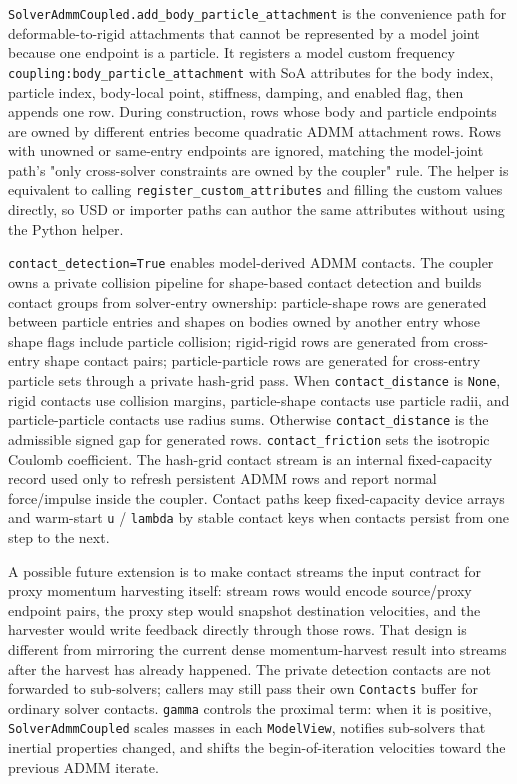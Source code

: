 \documentclass[11pt]{article}
\begin{document}
\texttt{SolverAdmmCoupled.add\_body\_particle\_attachment} is the convenience
path for deformable-to-rigid attachments that cannot be represented by a model
joint because one endpoint is a particle. It registers a model custom frequency
\texttt{coupling:body\_particle\_attachment} with SoA attributes for the body
index, particle index, body-local point, stiffness, damping, and enabled flag, then
appends one row. During construction, rows whose body and particle endpoints are
owned by different entries become quadratic ADMM attachment rows. Rows with
unowned or same-entry endpoints are ignored, matching the model-joint path's
"only cross-solver constraints are owned by the coupler" rule. The helper is
equivalent to calling \texttt{register\_custom\_attributes} and filling the
custom values directly, so USD or importer paths can author the same attributes
without using the Python helper.

\texttt{contact\_detection=True} enables model-derived ADMM contacts. The
coupler owns a private collision pipeline for shape-based contact detection and
builds contact groups from solver-entry ownership: particle-shape rows are
generated between particle entries and shapes on bodies owned by another entry
whose shape flags include particle collision; rigid-rigid rows are generated
from cross-entry shape contact pairs; particle-particle rows are generated for
cross-entry particle sets through a private hash-grid pass. When
\texttt{contact\_distance} is \texttt{None}, rigid contacts use collision
margins, particle-shape contacts use particle radii, and particle-particle
contacts use radius sums. Otherwise \texttt{contact\_distance} is the admissible
signed gap for generated rows. \texttt{contact\_friction} sets the isotropic
Coulomb coefficient. The hash-grid contact stream is an internal fixed-capacity
record used only to refresh persistent ADMM rows and report normal force/impulse
inside the coupler. Contact paths keep fixed-capacity device arrays and
warm-start \texttt{u} / \texttt{lambda} by stable contact keys when contacts
persist from one step to the next.

A possible future extension is to make contact streams the input contract for
proxy momentum harvesting itself: stream rows would encode source/proxy endpoint
pairs, the proxy step would snapshot destination velocities, and the harvester
would write feedback directly through those rows. That design is different from
mirroring the current dense momentum-harvest result into streams after the
harvest has already happened. The private detection contacts are not forwarded
to sub-solvers; callers may still pass their own \texttt{Contacts} buffer for
ordinary solver contacts. \texttt{gamma} controls the proximal term: when it is
positive, \texttt{SolverAdmmCoupled} scales masses in each \texttt{ModelView},
notifies sub-solvers that inertial properties changed, and shifts the
begin-of-iteration velocities toward the previous ADMM iterate.
\end{document}
